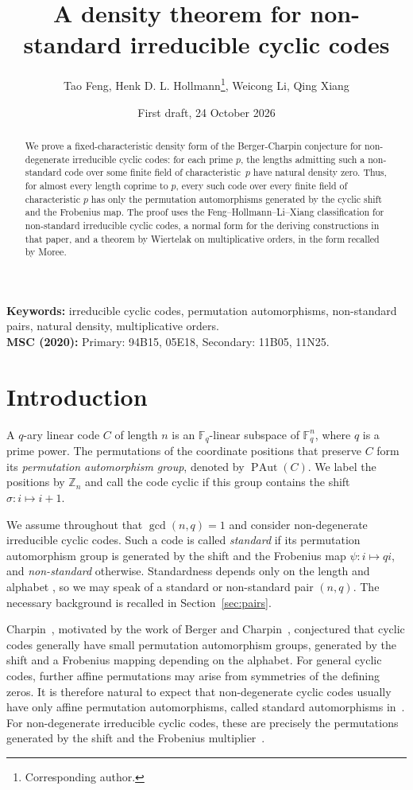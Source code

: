 \documentclass[11pt]{article}
\title{A density theorem for non-standard irreducible cyclic codes}
\author{\normalsize Tao Feng, Henk D. L. Hollmann\thanks{Corresponding author.}, Weicong Li, Qing Xiang}
\date{First draft, 24 October 2026}
\newcommand{\F}{{\mathbb{F}}}
\newcommand{\bbZ}{{\mathbb{Z}}}
\DeclareMathOperator{\PAut}{PAut}
\begin{document}
\maketitle
\begin{abstract}
We prove a fixed-characteristic density form of the Berger-Charpin conjecture
for non-degenerate irreducible cyclic codes: for each prime $p$, the
lengths admitting such a non-standard code over some finite field of
characteristic~$p$ have natural density zero. Thus, for almost every length coprime to $p$, every such
code over every finite field of characteristic $p$ has only the
permutation automorphisms generated by the cyclic shift and the
Frobenius map. The proof uses the
Feng--Hollmann--Li--Xiang classification for non-standard irreducible cyclic codes, a normal form for the deriving constructions in that paper, and a theorem by Wiertelak on multiplicative orders, in the form recalled by Moree.
\end{abstract}
\begin{center}
\small
\textbf{Keywords:} irreducible cyclic codes, permutation automorphisms,
non-standard pairs, natural density, multiplicative orders.\\[4pt]
\textbf{MSC (2020):} Primary: 94B15, 05E18, Secondary: 11B05, 11N25.
\end{center}

\section{Introduction}
%
A $q$-ary linear code $C$ of length $n$ is an $\F_q$-linear subspace
of $\F_q^n$, where $q$ is a prime power. The permutations of the
coordinate positions that preserve $C$ form its \emph{permutation
automorphism group}, denoted by $\PAut(C)$. We label the positions
by $\bbZ_n$ and call the code cyclic if this group contains the shift
$\sigma:i\mapsto i+1$.

We assume throughout that $\gcd(n,q)=1$ and consider non-degenerate
irreducible cyclic codes. Such a code is called \emph{standard} if
its permutation automorphism group is generated by the shift and
the Frobenius map $\psi:i\mapsto qi$, and \emph{non-standard}
otherwise. Standardness depends only on the length and alphabet \cite[Proposition 5.19]{HollmannI},
so we may speak of a standard or non-standard pair $(n,q)$. The necessary
background is recalled in Section~\ref{sec:pairs}.

Charpin~\cite[Section 3.5]{Charpin}, motivated by the work of Berger
and Charpin~\cite{BergerCharpin}, conjectured that cyclic codes
generally have small permutation automorphism groups, generated
by the shift and a Frobenius mapping depending on the alphabet.
For general cyclic codes, further affine permutations may arise
from symmetries of the defining zeros. It is therefore natural
to expect that non-degenerate cyclic codes usually have only
affine permutation automorphisms, called standard automorphisms
in~\cite[Theorem 5.28, Definition 5.29]{HollmannI}.
For non-degenerate irreducible cyclic codes, these are precisely
the permutations generated by the shift and the Frobenius
multiplier~\cite[Corollary 5.17]{HollmannI}.
\end{document}
